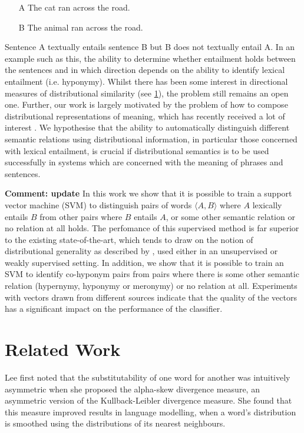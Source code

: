 \documentclass[11pt]{article}
\begin{document}
\begin{itemize}
\item[A]{The cat ran across the road.}
\item[B]{The animal ran across the road.}
\end{itemize}

Sentence A textually entails sentence B but B does not textually entail A. In an example such as this, the ability to determine whether entailment holds between the sentences and in which direction depends on the ability to identify lexical entailment (i.e. hyponymy). Whilst there has been some interest in directional measures of distributional similarity (see \ref{sect:relwork}), the problem still remains an open one.  Further, our work is largely motivated by the problem of how to compose distributional representations of meaning, which has recently received a lot of interest \cite{Widdows:08,Mitchell:08,Baroni2010,Grefenstette:11,Socher:12}.  We hypothesise that the ability to automatically distinguish different semantic relations using distributional information, in particular those concerned with lexical entailment, is crucial if distributional semantics is to be used successfully in systems which are concerned with the meaning of phrases and sentences.

{\bf Comment: update} In this work we show that it is possible to train a support vector machine (SVM) to distinguish pairs of words $\langle A,B\rangle$ where $A$ lexically entails $B$ from other pairs where $B$ entails $A$, or some other semantic relation or no relation at all holds.  The perfomance of this supervised method is far superior to the existing state-of-the-art, which tends to draw on the notion of distributional generality as described by \cite{Weeds2004}, used either in an unsupervised or weakly supervised setting.  In addition, we show that it is possible to train an SVM to identify co-hyponym pairs from pairs where there is some other semantic relation (hypernymy, hyponymy or meronymy) or no relation at all. Experiments with vectors drawn from different sources indicate that the quality of the vectors has a significant impact on the performance of the classifier.

\section{Related Work}
\label{sect:relwork}

Lee  first noted that the substitutability of one word for another was intuitively asymmetric when she proposed the alpha-skew divergence measure, an asymmetric version of the Kullback-Leibler divergence measure.  She found that this measure improved results in language modelling, when a word's distribution is smoothed using the distributions of its nearest neighbours.
\end{document}
